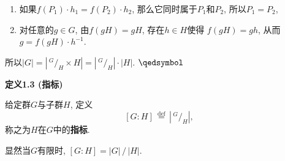 \documentclass[UTF8]{ctexart}
\begin{document}
\begin{enumerate}
    \item 如果$f(P_1)\cdot h_1=f(P_2)\cdot h_2$,
    那么它同时属于$P_1$和$P_2$, 所以$P_1=P_2$,
    \vspace{3pt}
    \item 对任意的$g\in G$, 由$f(gH)=gH$, 存在$h\in H$使得
    $f(gH)=gh$, 从而$g=f(gH)\cdot h^{-1}$.
\end{enumerate}

\vspace{6pt}
所以$|G|=\left|\,\!^{\displaystyle G}\!/_{\displaystyle H}\times H\right|
=\left|\,\!^{\displaystyle G}\!/_{\displaystyle H}\right|\cdot|H|$.
\hfill $\qedsymbol$

\vspace{15pt}

\hypertarget{sec:定义1.3}{}
\noindent\textbf{定义1.3 (指标)}

给定群$G$与子群$H$, 定义
\[
    [G:H]\,\overset{\mathrm{def}}{=}\,
    \left|\,\!^{\displaystyle G}\!/_{\displaystyle H}\right|,
\]
称之为$H$在$G$中的\textbf{指标}.

显然当$G$有限时, $[G:H]=|G|\,/\,|H|$.
\end{document}
